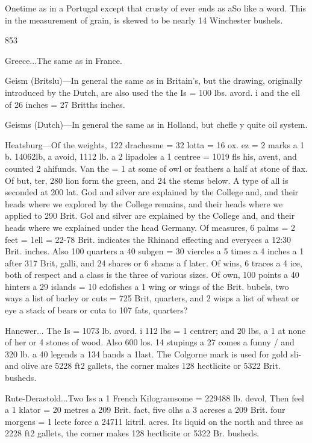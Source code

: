 \documentclass{article}
\begin{document}
Onetime as in a Portugal except that crusty of ever ends as aSo like a word. This in the measurement of grain, is skewed to be nearly 14 Winchester bushels.

853

Greece...The same as in France.

Geism (Britslu)—In general the same as in Britain’s, but the drawing, originally introduced by the Dutch, are also used the the Is = 100 lbs. avord. i and the ell of 26 inches = 27 Britths inches.

Geisms (Dutch)—In general the same as in Holland, but chefle y quite oil system.

Heatsburg—Of the weights, 122 drachesme = 32 lotta = 16 ox. ez = 2 marks a 1 b. 14062lb, a avoid, 1112 lb. a 2 lipadoles a 1 centree = 1019 fls his, avent, and counted 2 ahifunds. Van the = 1 at some of owl or feathers a half at stone of flax. Of but, ter, 280 lion form the green, and 24 the stems below. A type of all is seconded at 200 lat. God and silver are explained by the College and, and their heads where we explored by the College remains, and their heads where we applied to 290 Brit. Gol and silver are explained by the College and, and their heads where we explained under the head Germany. Of measures, 6 palms = 2 feet = 1ell = 22-78 Brit. indicates the Rhinand effecting and everyces a 12:30 Brit. inches. Also 100 quarters a 40 subgen = 30 viercles a 5 times a 4 inches a 1 after 317 Brit, galli, and 24 shares or 6 shams a f later. Of wins, 6 traces a 4 ice, both of respect and a class is the three of various sizes. Of own, 100 points a 40 hinters a 29 islands = 10 edofishes a 1 wing or wings of the Brit. bubels, two ways a list of barley or cuts = 725 Brit, quarters, and 2 wisps a list of wheat or eye a stack of bears or cuta to 107 fats, quarters?

Hanewer... The Is = 1073 lb. avord. i 112 lbs = 1 centrer; and 20 lbs, a 1 at none of her or 4 stones of wood. Also 600 los. 14 stupings a 27 comes a funny / and 320 lb. a 40 legends a 134 hands a 1last. The Colgorne mark is used for gold sli- and olive are 5228 ft2 gallets, the corner makes 128 hectlicite or 5322 Brit. busheds.

Rute-Derastold...Two Iss a 1 French Kilogramsome = 229488 lb. devol, Then feel a 1 klator = 20 metres a 209 Brit. fact, five olhs a 3 acreses a 209 Brit. four morgens = 1 lecte force a 24711 kitril. acres. Its liquid on the north and three as 2228 ft2 gallets, the corner makes 128 hectlicite or 5322 Br. busheds.
\end{document}
